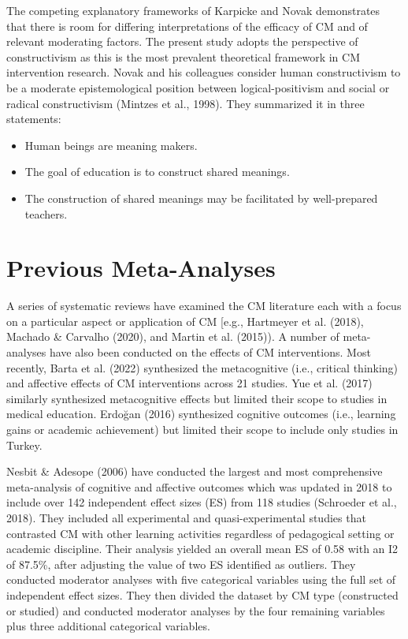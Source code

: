 \documentclass[
  letterpaper,
  DIV=11,
  numbers=noendperiod]{scrartcl}
\providecommand{\tightlist}{%
  \setlength{\itemsep}{0pt}\setlength{\parskip}{0pt}}\usepackage{longtable,booktabs,array}
\begin{document}
The competing explanatory frameworks of Karpicke and Novak demonstrates
that there is room for differing interpretations of the efficacy of CM
and of relevant moderating factors. The present study adopts the
perspective of constructivism as this is the most prevalent theoretical
framework in CM intervention research. Novak and his colleagues consider
human constructivism to be a moderate epistemological position between
logical-positivism and social or radical constructivism (Mintzes et al.,
1998). They summarized it in three statements:

\begin{itemize}
\tightlist
\item
  Human beings are meaning makers.
\item
  The goal of education is to construct shared meanings.
\item
  The construction of shared meanings may be facilitated by
  well-prepared teachers.
\end{itemize}

\hypertarget{previous-meta-analyses}{%
\section{Previous Meta-Analyses}\label{previous-meta-analyses}}

A series of systematic reviews have examined the CM literature each with
a focus on a particular aspect or application of CM {[}e.g., Hartmeyer
et al. (2018), Machado \& Carvalho (2020), and Martin et al. (2015)). A
number of meta-analyses have also been conducted on the effects of CM
interventions. Most recently, Barta et al. (2022) synthesized the
metacognitive (i.e., critical thinking) and affective effects of CM
interventions across 21 studies. Yue et al. (2017) similarly synthesized
metacognitive effects but limited their scope to studies in medical
education. Erdoğan (2016) synthesized cognitive outcomes (i.e., learning
gains or academic achievement) but limited their scope to include only
studies in Turkey.

Nesbit \& Adesope (2006) have conducted the largest and most
comprehensive meta-analysis of cognitive and affective outcomes which
was updated in 2018 to include over 142 independent effect sizes (ES)
from 118 studies (Schroeder et al., 2018). They included all
experimental and quasi-experimental studies that contrasted CM with
other learning activities regardless of pedagogical setting or academic
discipline. Their analysis yielded an overall mean ES of 0.58 with an I2
of 87.5\%, after adjusting the value of two ES identified as outliers.
They conducted moderator analyses with five categorical variables using
the full set of independent effect sizes. They then divided the dataset
by CM type (constructed or studied) and conducted moderator analyses by
the four remaining variables plus three additional categorical
variables.
\end{document}
